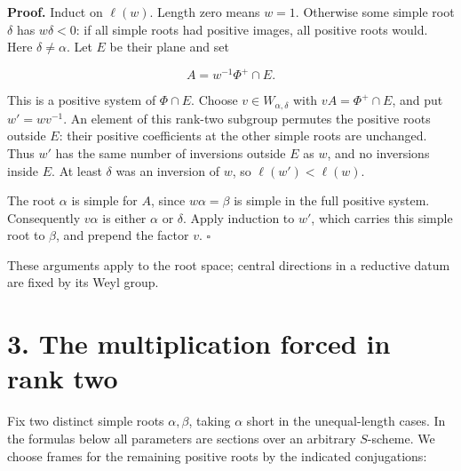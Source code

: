 \documentclass[11pt,a4paper,openany]{report}
\begin{document}
\textbf{Proof.} Induct on \(\ell(w)\). Length zero means \(w=1\). Otherwise some simple root \(\delta\) has \(w\delta<0\): if all simple roots had positive images, all positive roots would. Here \(\delta\ne\alpha\). Let \(E\) be their plane and set

\[
A=w^{-1}\Phi^+\cap E.
\]

This is a positive system of \(\Phi\cap E\). Choose \(v\in W_{\alpha,\delta}\) with \(vA=\Phi^+\cap E\), and put \(w'=wv^{-1}\). An element of this rank-two subgroup permutes the positive roots outside \(E\): their positive coefficients at the other simple roots are unchanged. Thus \(w'\) has the same number of inversions outside \(E\) as \(w\), and no inversions inside \(E\). At least \(\delta\) was an inversion of \(w\), so \(\ell(w')<\ell(w)\).

The root \(\alpha\) is simple for \(A\), since \(w\alpha=\beta\) is simple in the full positive system. Consequently \(v\alpha\) is either \(\alpha\) or \(\delta\). Apply induction to \(w'\), which carries this simple root to \(\beta\), and prepend the factor \(v\). \(\square\)

These arguments apply to the root space; central directions in a reductive datum are fixed by its Weyl group.

\section{3. The multiplication forced in rank two}\label{AG-RG-05-the-multiplication-forced-in-rank-two}

Fix two distinct simple roots \(\alpha,\beta\), taking \(\alpha\) short in the unequal-length cases. In the formulas below all parameters are sections over an arbitrary \(S\)-scheme. We choose frames for the remaining positive roots by the indicated conjugations:
\end{document}
